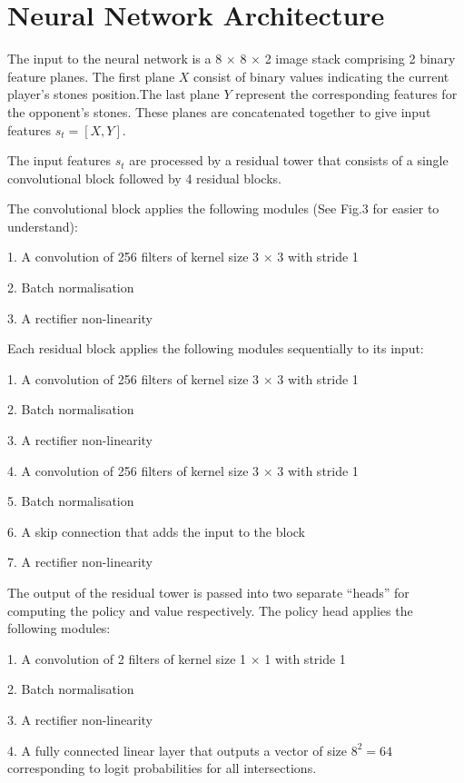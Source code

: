 \documentclass[12pt,a4paper]{report}
\begin{document}
\section{Neural Network Architecture}
\hspace{0.6cm}The input to the neural network is a 8 × 8 × 2 image stack comprising 2 binary feature planes. The first plane \(X\) consist of binary values indicating the current player's stones position.The last plane \(Y\) represent the corresponding features for the opponent’s stones. These planes are concatenated together to give input features \(s_t = [X, Y]\).\par
The input features \(s_t\) are processed by a residual tower that consists of a single convolutional block followed by 4 residual blocks\cite{ResNet}.\par
The convolutional block applies the following modules (See Fig.3 for easier to understand):\par
1. A convolution of 256 filters of kernel size 3 × 3 with stride 1\par
2. Batch normalisation\cite{BN}\par
3. A rectifier non-linearity\par
Each residual block applies the following modules sequentially to its input:\par
1. A convolution of 256 filters of kernel size 3 × 3 with stride 1\par
2. Batch normalisation\par
3. A rectifier non-linearity\par
4. A convolution of 256 filters of kernel size 3 × 3 with stride 1\par
5. Batch normalisation\par
6. A skip connection that adds the input to the block\par
7. A rectifier non-linearity\par
The output of the residual tower is passed into two separate “heads” for computing the policy and value respectively. The policy head applies the following modules:\par
1. A convolution of 2 filters of kernel size 1 × 1 with stride 1\par
2. Batch normalisation\par
3. A rectifier non-linearity\par
4. A fully connected linear layer that outputs a vector of size \(8^2 = 64\) corresponding to logit probabilities for all intersections.\par
\end{document}
